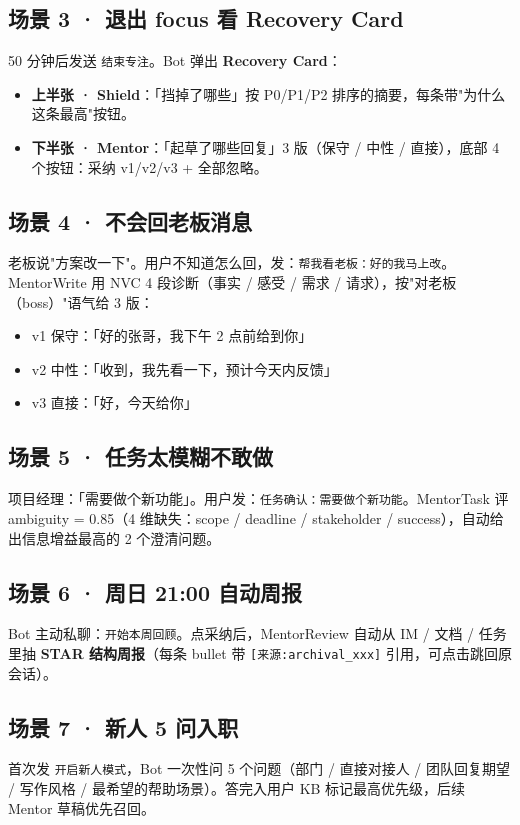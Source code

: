 \documentclass[11pt,a4paper]{ctexart}
\begin{document}
\subsection{场景 3 · 退出 focus 看 Recovery Card}
50 分钟后发送 \texttt{结束专注}。Bot 弹出 \textbf{Recovery Card}：
\begin{itemize}
\item \textbf{上半张 · Shield}：「挡掉了哪些」按 P0/P1/P2 排序的摘要，每条带"为什么这条最高"按钮。
\item \textbf{下半张 · Mentor}：「起草了哪些回复」3 版（保守 / 中性 / 直接），底部 4 个按钮：采纳 v1/v2/v3 + 全部忽略。
\end{itemize}

\subsection{场景 4 · 不会回老板消息}
老板说"方案改一下"。用户不知道怎么回，发：\texttt{帮我看老板：好的我马上改}。MentorWrite 用 NVC 4 段诊断（事实 / 感受 / 需求 / 请求），按"对老板（boss）"语气给 3 版：
\begin{itemize}
\item v1 保守：「好的张哥，我下午 2 点前给到你」
\item v2 中性：「收到，我先看一下，预计今天内反馈」
\item v3 直接：「好，今天给你」
\end{itemize}

\subsection{场景 5 · 任务太模糊不敢做}
项目经理：「需要做个新功能」。用户发：\texttt{任务确认：需要做个新功能}。MentorTask 评 ambiguity = 0.85（4 维缺失：scope / deadline / stakeholder / success），自动给出信息增益最高的 2 个澄清问题。

\subsection{场景 6 · 周日 21:00 自动周报}
Bot 主动私聊：\texttt{开始本周回顾}。点采纳后，MentorReview 自动从 IM / 文档 / 任务里抽\textbf{ STAR 结构周报}（每条 bullet 带 \texttt{[来源:archival\_xxx]} 引用，可点击跳回原会话）。

\subsection{场景 7 · 新人 5 问入职}
首次发 \texttt{开启新人模式}，Bot 一次性问 5 个问题（部门 / 直接对接人 / 团队回复期望 / 写作风格 / 最希望的帮助场景）。答完入用户 KB 标记最高优先级，后续 Mentor 草稿优先召回。
\end{document}

